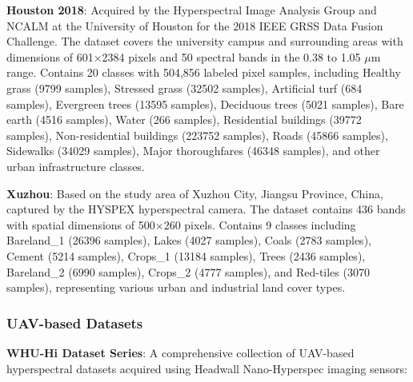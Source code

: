 \documentclass[journal]{IEEEtran}
\begin{document}
\textbf{Houston 2018}: Acquired by the Hyperspectral Image Analysis Group and NCALM at the University of Houston for the 2018 IEEE GRSS Data Fusion Challenge. The dataset covers the university campus and surrounding areas with dimensions of 601$\times$2384 pixels and 50 spectral bands in the 0.38 to 1.05 $\mu$m range. Contains 20 classes with 504,856 labeled pixel samples, including Healthy grass (9799 samples), Stressed grass (32502 samples), Artificial turf (684 samples), Evergreen trees (13595 samples), Deciduous trees (5021 samples), Bare earth (4516 samples), Water (266 samples), Residential buildings (39772 samples), Non-residential buildings (223752 samples), Roads (45866 samples), Sidewalks (34029 samples), Major thoroughfares (46348 samples), and other urban infrastructure classes.

\textbf{Xuzhou}: Based on the study area of Xuzhou City, Jiangsu Province, China, captured by the HYSPEX hyperspectral camera. The dataset contains 436 bands with spatial dimensions of 500$\times$260 pixels. Contains 9 classes including Bareland\_1 (26396 samples), Lakes (4027 samples), Coals (2783 samples), Cement (5214 samples), Crops\_1 (13184 samples), Trees (2436 samples), Bareland\_2 (6990 samples), Crops\_2 (4777 samples), and Red-tiles (3070 samples), representing various urban and industrial land cover types.

\subsubsection{UAV-based Datasets}

\textbf{WHU-Hi Dataset Series}: A comprehensive collection of UAV-based hyperspectral datasets acquired using Headwall Nano-Hyperspec imaging sensors:
\end{document}

